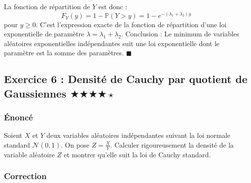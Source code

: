 \documentclass[11pt,a4paper]{article}
\begin{document}
La fonction de répartition de $Y$ est donc :
$$ F_Y(y) = 1 - \mathbb{P}(Y > y) = 1 - e^{-(\lambda_1 + \lambda_2)y} $$
pour $y \geq 0$. C'est l'expression exacte de la fonction de répartition d'une loi exponentielle de paramètre $\lambda = \lambda_1 + \lambda_2$.
Conclusion : Le minimum de variables aléatoires exponentielles indépendantes suit une loi exponentielle dont le paramètre est la somme des paramètres. $\blacksquare$


\subsection*{Exercice 6 : Densité de Cauchy par quotient de Gaussiennes \quad $\bigstar\bigstar\bigstar\bigstar\star$}

\subsubsection*{Énoncé}

Soient $X$ et $Y$ deux variables aléatoires indépendantes suivant la loi normale standard $\mathcal{N}(0, 1)$.
On pose $Z = \frac{X}{Y}$.
Calculer rigoureusement la densité de la variable aléatoire $Z$ et montrer qu'elle suit la loi de Cauchy standard.

\subsubsection*{Correction}
\end{document}
